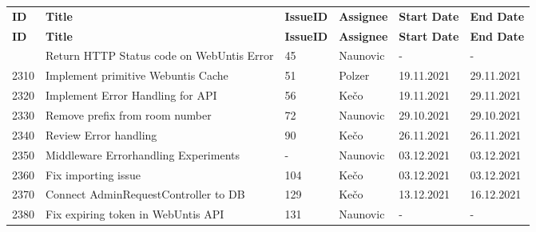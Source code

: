 
\begin{longtable}{|p{}|p{}|p{}|p{}|p{}|p{}|} \hline
    \textbf{ID} & \textbf{Title} & \textbf{Issue\-ID} & \textbf{Assignee} & \textbf{Start Date} & \textbf{End\- Date} \\ \hhline{|=|=|=|=|=|=|}
    \endfirsthead
    \hline
    \textbf{ID} & \textbf{Title} & \textbf{Issue\-ID} & \textbf{Assignee} & \textbf{Start Date} & \textbf{End\- Date} \\ \hhline{|=|=|=|=|=|=|}
    \endhead
    2300 & Return HTTP Status code on WebUntis Error & 45 & Naunovic & - & - \\ \hline
    2310 & Implement primitive Webuntis Cache & 51 & Polzer & 19.11.2021 & 29.11.2021 \\ \hline
    2320 & Implement Error Handling for API & 56 & Kečo & 19.11.2021 & 29.11.2021 \\ \hline
    2330 & Remove prefix from room number & 72 & Naunovic & 29.10.2021 & 29.10.2021 \\ \hline
    2340 & Review Error handling & 90 & Kečo & 26.11.2021 & 26.11.2021 \\ \hline
    2350 & Middleware Errorhandling Experiments & - & Naunovic & 03.12.2021 & 03.12.2021 \\ \hline
    2360 & Fix importing issue & 104 & Kečo & 03.12.2021 & 03.12.2021 \\ \hline
    2370 & Connect AdminRequestController to DB & 129 & Kečo & 13.12.2021 & 16.12.2021 \\ \hline
    2380 & Fix expiring token in WebUntis API & 131 & Naunovic & - & - \\ \hline
\end{longtable}


